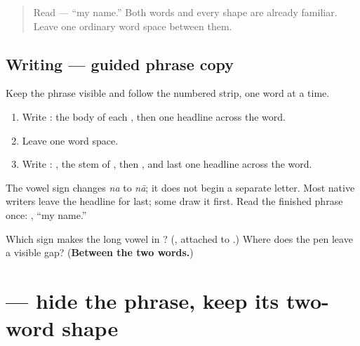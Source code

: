 \label{lesson:SA-W03-mama-nama-guided-copy}



\begin{quote}
Read \textbf{ } — “my name.” Both words and every shape are already familiar. Leave one ordinary word space between them.
\end{quote}

\subsection*{Writing — guided phrase copy}

Keep the phrase visible and follow the numbered strip, one word at a time.

\begin{enumerate}
\raggedright
  \item Write \textbf{}: the body of each \textbf{}, then one headline across the word.
  \item Leave one word space.
  \item Write \textbf{}: \textbf{}, the stem of \textbf{}, then \textbf{}, and last one headline across the word.
\end{enumerate}

The vowel sign changes \emph{na} to \emph{nā}; it does not begin a separate letter. Most native writers leave the headline for last; some draw it first. Read the finished phrase once: \textbf{ }, “my name.”

\begin{tcolorbox}[breakable,colback=teal!4,colframe=teal!35!black,title={Before you move on}]
Which sign makes the long vowel in \textbf{}? (\textbf{}, attached to \textbf{}.) Where does the pen leave a visible gap? (\textbf{Between the two words.})
\end{tcolorbox}
\section[\texorpdfstring{\sk{मम} \sk{नाम} (mama nāma)}{मम नाम (mama nāma)}]{  — hide the phrase, keep its two-word shape}

\label{lesson:SA-W03-mama-nama-delayed-copy}



